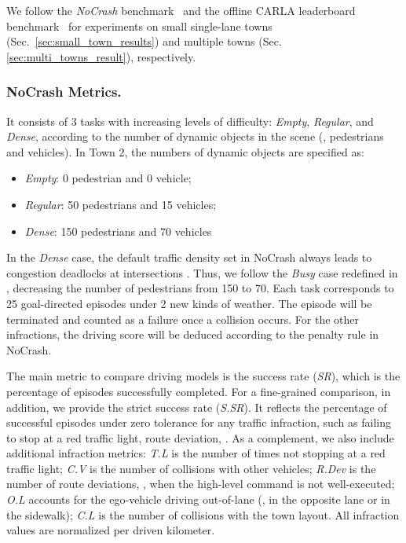 We follow the \emph{NoCrash} benchmark~\cite{Codevilla:2019} and the offline CARLA leaderboard benchmark~\cite{Zhang:2021,Hu:2022} for experiments on small single-lane towns (Sec.~\ref{sec:small_town_results}) and multiple towns (Sec.~ \ref{sec:multi_towns_result}), respectively.


\subsubsection{NoCrash Metrics.}\label{nocrash_metrics}
It consists of 3 tasks with increasing levels of difficulty: \emph{Empty}, \emph{Regular}, and \emph{Dense}, according to the number of dynamic objects in the scene ({\ie}, pedestrians and vehicles). 
In Town 2, the numbers of dynamic objects are specified as:
\begin{itemize}
	\item \emph{Empty}: 0 pedestrian and 0 vehicle;
	\item \emph{Regular}: 50 pedestrians and 15 vehicles;
	\item \emph{Dense}: 150 pedestrians and 70 vehicles
\end{itemize}
In the \emph{Dense} case, the default traffic density set in NoCrash always leads to congestion deadlocks at intersections \cite{Zhang:2021}. 
Thus, we follow the \emph{Busy} case redefined in \cite{Zhang:2021}, decreasing the number of pedestrians from 150 to 70. 
Each task corresponds to 25 goal-directed episodes under 2 new kinds of weather.
The episode will be terminated and counted as a failure once a collision occurs. 
For the other infractions, the driving score will be deduced according to the penalty rule in NoCrash. 


The main metric to compare driving models is the success rate (\emph{SR}), which is the percentage of episodes successfully completed. 
For a fine-grained comparison, in addition, we provide the strict success rate (\emph{S.SR}). 
It reflects the percentage of successful episodes under zero tolerance for any traffic infraction, such as failing to stop at a red traffic light, route deviation, {\etc}. 
As a complement, we also include additional infraction metrics: \emph{T.L} is the number of times not stopping at a red traffic light; 
\emph{C.V} is the number of collisions with other vehicles; 
\emph{R.Dev} is the number of route deviations, {\ie}, when the high-level command is not well-executed; 
\emph{O.L} accounts for the ego-vehicle driving out-of-lane ({\eg}, in the opposite lane or in the sidewalk); 
\emph{C.L} is the number of collisions with the town layout. 
All infraction values are normalized per driven kilometer.


